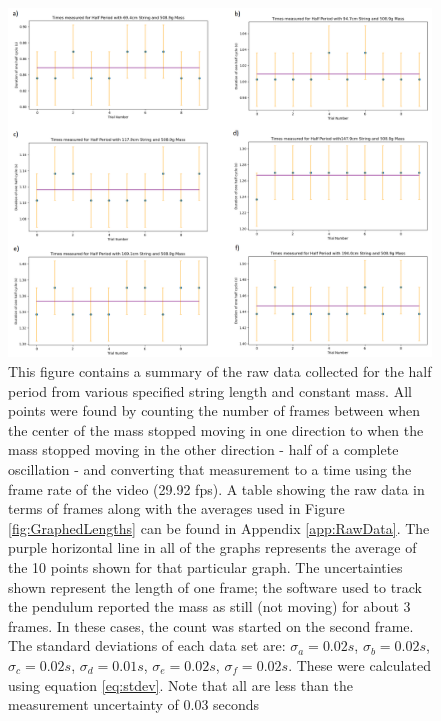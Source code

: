 \documentclass[11pt]{article}
\begin{document}
        \begin{figure}[H]
            \centering\includegraphics[width = \textwidth]{AllRawLengthTimes.PNG}
            \caption{This figure contains a summary of the raw data collected for the half period from various specified string length and constant mass. All points were found by counting the number of frames between when the center of the mass stopped moving in one direction to when the mass stopped moving in the other direction - half of a complete oscillation - and converting that measurement to a time using the frame rate of the video (29.92 fps). A table showing the raw data in terms of frames along with the averages used in Figure \ref{fig:GraphedLengths} can be found in Appendix \ref{app:RawData}. The purple horizontal line in all of the graphs represents the average of the 10 points shown for that particular graph. The uncertainties shown represent the length of one frame; the software used to track the pendulum reported the mass as still (not moving) for about 3 frames. In these cases, the count was started on the second frame. The standard deviations of each data set are: $\sigma_a = 0.02s$, $\sigma_b = 0.02s$, $\sigma_c = 0.02s$, $\sigma_d = 0.01s$, $\sigma_e = 0.02s$, $\sigma_f = 0.02s$. These were calculated using equation \ref{eq:stdev}. Note that all are less than the measurement uncertainty of 0.03 seconds}
            \label{fig:RawLengthData}
        \end{figure}
\end{document}
